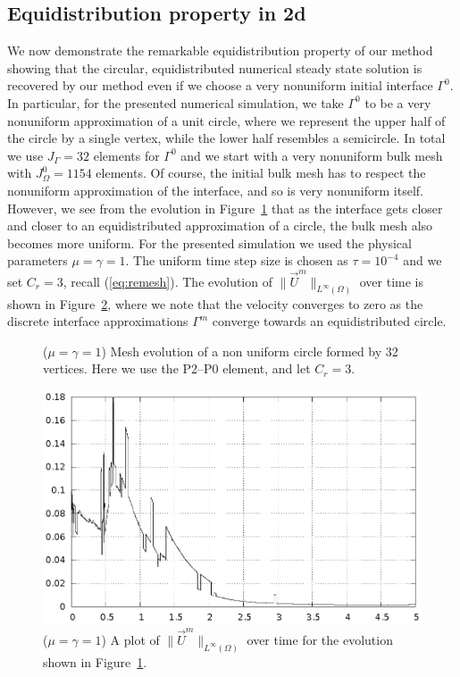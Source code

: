 \documentclass[a4paper,12pt,onecolumn]{article}
\begin{document}
\subsection{Equidistribution property in 2d}
We now demonstrate the remarkable equidistribution property of our method showing that the circular, equidistributed numerical steady state solution is recovered by our method even if we choose a very nonuniform initial interface $\Gamma^0$. 
In particular, for the presented numerical simulation, we take $\Gamma^0$ to 
be a very nonuniform approximation of a unit circle, where we represent the 
upper half of the circle by a single vertex, while the lower half resembles 
a semicircle. 
In total we use $J_\Gamma = 32$ elements for $\Gamma^0$ and we start with
a very nonuniform bulk mesh with $J_\Omega^0 = 1154$ elements.
Of course, the initial bulk mesh has to respect the nonuniform approximation 
of the interface, and so is very nonuniform itself.
However, we see from the evolution in Figure~\ref{fig:nonuniform_bubble_32_both}
that as the interface gets closer and closer to an equidistributed
approximation of a circle, the bulk mesh also becomes more uniform. For
the presented simulation we used the physical parameters
$\mu= \gamma=1$. The uniform time step size is chosen as $\tau=10^{-4}$ and 
we set $C_r=3$, recall (\ref{eq:remesh}). 
The evolution of $\|\vec U^m\|_{L^\infty(\Omega)}$ over time is shown in
Figure~\ref{fig:nonuniform_bubble_velocity_32_both}, where we note that the
velocity converges to zero as the discrete interface approximations 
$\Gamma^m$ converge towards an equidistributed circle.
\begin{figure}[htbp]
  \centering
  \caption{($\mu=\gamma=1$) Mesh evolution of a non uniform circle formed by 32 vertices. Here we use the P2--P0 element, and let $C_r = 3$.}
  \label{fig:nonuniform_bubble_32_both}
\end{figure}

\begin{figure}[htbp]
  \centering
  \includegraphics[width=.45\textwidth]{figures/nonuniform_bubble_velocity_32_both.ps}
\caption{($\mu=\gamma=1$) A plot of $\|\vec U^m\|_{L^\infty(\Omega)}$ over time
for the evolution shown in Figure~\ref{fig:nonuniform_bubble_32_both}.}
\label{fig:nonuniform_bubble_velocity_32_both}
\end{figure}
\end{document}

